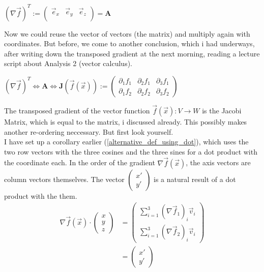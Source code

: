 \documentclass[a4paper]{article}
\begin{document}
\begin{Example}
\begin{center}
$(\nabla\vec{f})^{T} := \begin{pmatrix}\vec{e}_{x} & \vec{e}_{y} &\vec{e}_{z}\\\end{pmatrix} = \boldsymbol{A} $
\end{center}

Now we could reuse the vector of vectors (the matrix) and multiply again with coordinates. But before, we come to another conclusion, which i had underways, after writing down the transposed gradient at the next morning, reading a lecture script about Analysis 2 (vector calculus).\\

\begin{center}
$(\nabla\vec{f})^{T} \Leftrightarrow  \boldsymbol{A}  \Leftrightarrow \boldsymbol{J}(\vec{f}(\vec{x})) := \begin{pmatrix}\partial_{1}f_{1} & \partial_{2}f_{1} & \partial_{3}f_{1}\\\partial_{1}f_{2} & \partial_{2}f_{2} & \partial_{3}f_{2}\end{pmatrix}$
\end{center}

The transposed gradient of the vector function $\vec{f}(\vec{x}) : V \rightarrow W$ is the Jacobi Matrix, which is equal to the matrix, i discussed already. This possibly makes another re-ordering neccessary. But first look yourself.\\

I have set up a corollary earlier (\ref{alternative_def_using_dot}), which uses the two row vectors with the three cosines and the three sines for a dot product with the coordinate each. In the order of the gradient $\nabla\vec{f}(\vec{x})$, the axis vectors are column vectors themselves. The vector $\begin{pmatrix}x'\\y'\end{pmatrix}$ is a natural result of a dot product with the them.\\

\begin{displaymath}
\begin{align}
\nabla\vec{f}(\vec{x}) \cdot \begin{pmatrix}x\\y\\z\end{pmatrix} &= \begin{pmatrix}\sum_{i=1}^{3}(\nabla\vec{f}_{1})_{i}\vec{v}_{i}\\\sum_{i=1}^{3}(\nabla\vec{f}_{2})_{i}\vec{v}_{i}\end{pmatrix}\\ &= \begin{pmatrix}x'\\y'\end{pmatrix}
\end{align}
\end{displaymath}


\end{Example}
\end{document}
